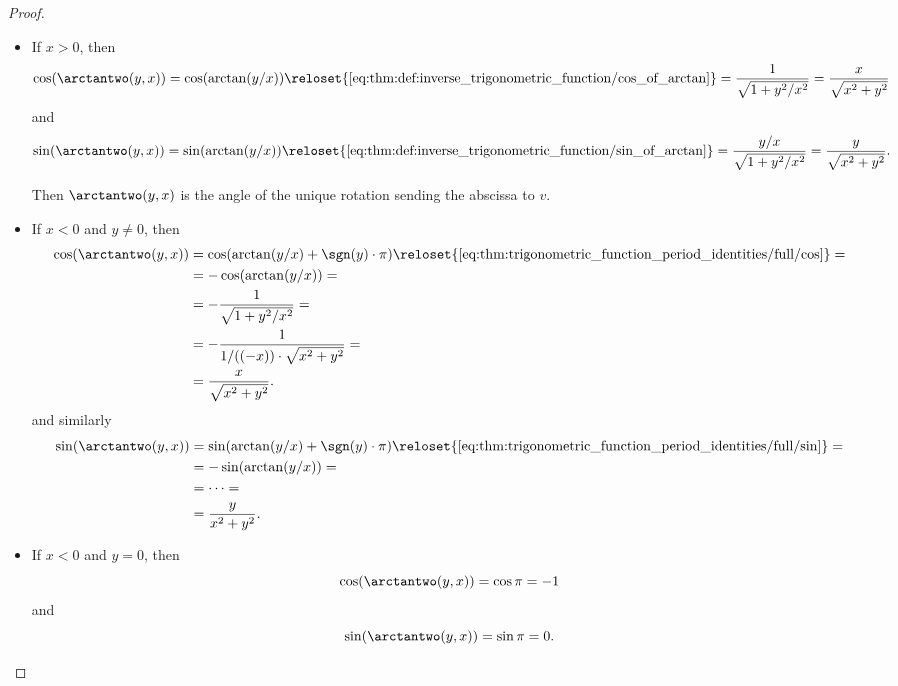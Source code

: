 \begin{proof}
  \hfill
  \begin{itemize}
    \item If \( x > 0 \), then
    \begin{equation*}
      \cos(\arctantwo(y, x))
      =
      \cos(\arctan(y / x))
      \reloset {\eqref{eq:thm:def:inverse_trigonometric_function/cos_of_arctan}} =
      \frac 1 {\sqrt{1 + y^2 / x^2}}
      =
      \frac x {\sqrt{x^2 + y^2}}
    \end{equation*}
    and
    \begin{equation*}
      \sin(\arctantwo(y, x))
      =
      \sin(\arctan(y / x))
      \reloset {\eqref{eq:thm:def:inverse_trigonometric_function/sin_of_arctan}} =
      \frac {y / x} {\sqrt{1 + y^2 / x^2}}
      =
      \frac y {\sqrt{x^2 + y^2}}.
    \end{equation*}

    Then \( \arctantwo(y, x) \) is the angle of the unique rotation sending the abscissa to \( v \).

    \item If \( x < 0 \) and \( y \neq 0 \), then
    \begin{align*}
      \cos(\arctantwo(y, x))
      &=
      \cos(\arctan(y / x) + \sgn(y) \cdot \pi)
      \reloset {\eqref{eq:thm:trigonometric_function_period_identities/full/cos}} = \\ &=
      -\cos(\arctan(y / x))
      = \\ &=
      -\frac 1 {\sqrt{1 + y^2 / x^2}}
      = \\ &=
      -\frac 1 {1 / ((-x)) \cdot \sqrt{x^2 + y^2}}
      = \\ &=
      \frac x {\sqrt{x^2 + y^2}}.
    \end{align*}
    and similarly
    \begin{align*}
      \sin(\arctantwo(y, x))
      &=
      \sin(\arctan(y / x)  + \sgn(y) \cdot \pi)
      \reloset {\eqref{eq:thm:trigonometric_function_period_identities/full/sin}} = \\ &=
      -\sin(\arctan(y / x))
      = \\ &=
      \cdots
      = \\ &=
      \frac y {x^2 + y^2}.
    \end{align*}

    \item If \( x < 0 \) and \( y = 0 \), then
    \begin{equation*}
      \cos(\arctantwo(y, x)) = \cos \pi = -1
    \end{equation*}
    and
    \begin{equation*}
      \sin(\arctantwo(y, x)) = \sin \pi = 0.
    \end{equation*}


\end{itemize}
\end{proof}
